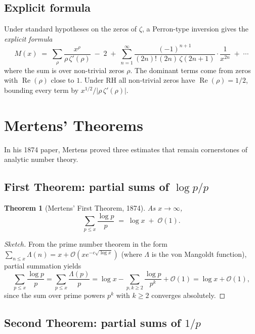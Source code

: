 \documentclass[12pt,a4paper]{amsart}
\newtheorem{theorem}{Theorem}[section]
\theoremstyle{definition}
\newcommand{\BigO}{\mathcal{O}}
\begin{document}
\subsection{Explicit formula}

Under standard hypotheses on the zeros of $\zeta$, a Perron-type inversion
gives the \emph{explicit formula}
\begin{equation}
\label{eq:explicit}
  M(x) \;=\; \sum_{\rho}\frac{x^{\rho}}{\rho\,\zeta'(\rho)}
           \;-\; 2 \;+\; \sum_{n=1}^{\infty} \frac{(-1)^{n+1}}{(2n)!\,(2n)\,\zeta(2n+1)}
           \cdot \frac{1}{x^{2n}} \;+\; \cdots
\end{equation}
where the sum is over non-trivial zeros $\rho$.  The dominant terms come from
zeros with $\operatorname{Re}(\rho)$ close to $1$.  Under RH all non-trivial
zeros have $\operatorname{Re}(\rho)=1/2$, bounding every term by
$x^{1/2}/|\rho\,\zeta'(\rho)|$.

\section{Mertens' Theorems}
\label{sec:three-theorems}

In his 1874 paper, Mertens proved three estimates that remain cornerstones of
analytic number theory.

\subsection{First Theorem: partial sums of \texorpdfstring{$\log p/p$}{log p/p}}

\begin{theorem}[Mertens' First Theorem, 1874]
\label{thm:mertens1}
As $x \to \infty$,
\[
  \sum_{p \le x} \frac{\log p}{p} \;=\; \log x \;+\; \BigO(1).
\]
\end{theorem}

\begin{proof}[Sketch]
From the prime number theorem in the form
$\sum_{n \le x} \Lambda(n) = x + \BigO(xe^{-c\sqrt{\log x}})$ (where
$\Lambda$ is the von Mangoldt function), partial summation yields
\[
  \sum_{p \le x} \frac{\log p}{p}
  = \sum_{p \le x} \frac{\Lambda(p)}{p}
  = \log x - \sum_{p,k \ge 2} \frac{\log p}{p^k} + \BigO(1)
  = \log x + \BigO(1),
\]
since the sum over prime powers $p^k$ with $k \ge 2$ converges absolutely.
\end{proof}

\subsection{Second Theorem: partial sums of \texorpdfstring{$1/p$}{1/p}}
\end{document}
